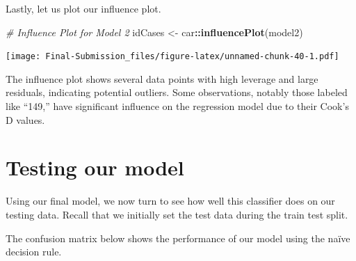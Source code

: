 \documentclass[
]{article}
\newenvironment{Shaded}{\begin{snugshade}}{\end{snugshade}}
\newcommand{\AttributeTok}[1]{\textcolor[rgb]{0.13,0.29,0.53}{#1}}
\newcommand{\CommentTok}[1]{\textcolor[rgb]{0.56,0.35,0.01}{\textit{#1}}}
\newcommand{\DecValTok}[1]{\textcolor[rgb]{0.00,0.00,0.81}{#1}}
\newcommand{\FloatTok}[1]{\textcolor[rgb]{0.00,0.00,0.81}{#1}}
\newcommand{\FunctionTok}[1]{\textcolor[rgb]{0.13,0.29,0.53}{\textbf{#1}}}
\newcommand{\NormalTok}[1]{#1}
\newcommand{\OtherTok}[1]{\textcolor[rgb]{0.56,0.35,0.01}{#1}}
\newcommand{\SpecialCharTok}[1]{\textcolor[rgb]{0.81,0.36,0.00}{\textbf{#1}}}
\newcommand{\StringTok}[1]{\textcolor[rgb]{0.31,0.60,0.02}{#1}}
\begin{document}
Lastly, let us plot our influence plot.

\begin{Shaded}
\begin{Highlighting}[]
\CommentTok{\# Influence Plot for Model 2}
\NormalTok{idCases }\OtherTok{\textless{}{-}}\NormalTok{ car}\SpecialCharTok{::}\FunctionTok{influencePlot}\NormalTok{(model2)}
\end{Highlighting}
\end{Shaded}

\texttt{[image: Final-Submission\_files/figure-latex/unnamed-chunk-40-1.pdf]}

The influence plot shows several data points with high leverage and
large residuals, indicating potential outliers. Some observations,
notably those labeled like ``149,'' have significant influence on the
regression model due to their Cook's D values.

\hypertarget{testing-our-model}{%
\section{Testing our model}\label{testing-our-model}}

Using our final model, we now turn to see how well this classifier does
on our testing data. Recall that we initially set the test data during
the train test split.

The confusion matrix below shows the performance of our model using the
naïve decision rule.

\begin{Shaded}
\end{Shaded}
\end{document}
